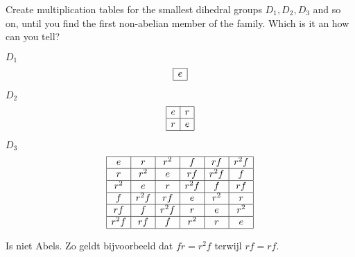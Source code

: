 \documentclass[11pt]{exam}
\begin{document}
\begin{questions}
	
	\question Create multiplication tables for the smallest dihedral groups $D_1, D_2, D_3$ and so on, until you find the first non-abelian member of the family. Which is it an how can you tell?
	\begin{solution}
		\par $D_1$
		\[
			\begin{array}{|c|}
			\hline
			e\\
			\hline
			\end{array}
		\]
		\par $D_2$
		\[
			\begin{array}{|c|c|}
			\hline
			e& r\\
			\hline
			r & e\\
			\hline
			\end{array}
		\]
		\par $D_3$
		\[
			\begin{array}{|c|c|c|c|c|c|}
			\hline
			e & r & r^2 & f & rf & r^2f\\
			\hline
			r & r^2 & e & rf & r^2 f & f\\
			\hline
			r^2 & e & r & r^2f & f & rf\\
			\hline
			f & r^2f & rf & e & r^2 & r\\
			\hline
			rf & f & r^2f & r & e & r^2\\
			\hline
			r^2f & rf & f & r^2 & r & e\\
			\hline 
			\end{array}
		\]
		\par Is niet Abels. Zo geldt bijvoorbeeld dat $fr = r^2f$ terwijl $rf = rf$.
	\end{solution}
	

\end{questions}
\end{document}

